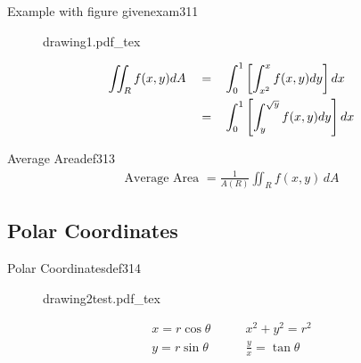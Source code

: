 \begin{example}{Example with figure given}{exam311}
    \begin{figure}[H]
        \def\svgwidth{\columnwidth}
        {drawing1.pdf_tex}
    \end{figure}
    \begin{align}
        \iint_R f(x,y) dA \quad = & \quad \int_0^1\left[\int_{x^2}^{x} f(x,y)dy\right]dx \\
        \quad = & \quad \int_0^1\left[\int_{y}^{\sqrt{y}} f(x,y)dy\right]dx
    \end{align}
\end{example}

\begin{definition}{Average Area}{def313}
    \begin{align*}
        \text{Average Area } = \frac{1}{A(R)}\iint_{R} f(x,y)\,dA
    \end{align*}
\end{definition}

\subsection{Polar Coordinates}
\begin{definitionside}{Polar Coordinates}{def314}
    \begin{figure}[H]
        \def\svgwidth{\columnwidth}
        {drawing2test.pdf_tex}
    \end{figure}
    \tcblower
    \begin{align*}
        x = r\cos\theta \quad & \quad x^2+y^2=r^2 \\
        y = r\sin\theta \quad & \quad \frac{y}x = \tan\theta
    \end{align*}
\end{definitionside}


